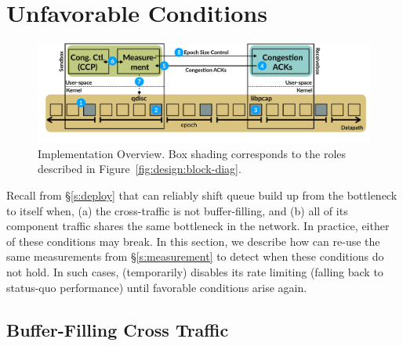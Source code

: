 \section{Unfavorable Conditions}\label{s:queue-ctl}
\begin{figure}[t]
    \centering
    \includegraphics[width=2\columnwidth]{img/bundler-diagram}
    \vspace{-10pt}
    \caption{\name Implementation Overview. Box shading corresponds to the roles described in Figure~\ref{fig:design:block-diag}.}\label{fig:bundler}
\end{figure}

Recall from \S\ref{s:deploy} that \name can reliably shift queue build up from the bottleneck to itself when, (a) the cross-traffic is not buffer-filling, and (b) all of its component traffic shares the same bottleneck in the network.
In practice, either of these conditions may break. 
In this section, we describe how \name can re-use the same measurements from \S\ref{s:measurement} to detect when these conditions do not hold. In such cases, \name (temporarily) disables its rate limiting (falling back to status-quo performance) until favorable conditions arise again. 

\subsection{Buffer-Filling Cross Traffic}



